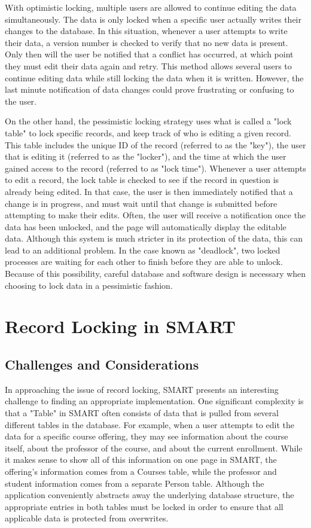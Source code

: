 \documentclass[12pt]{article}
\begin{document}
With optimistic locking, multiple users are allowed to continue editing the data simultaneously. The data is only locked when a specific user actually writes their changes to the database. In this situation, whenever a user attempts to write their data, a version number is checked to verify that no new data is present. Only then will the user be notified that a conflict has occurred, at which point they must edit their data again and retry. This method allows several users to continue editing data while still locking the data when it is written. However, the last minute notification of data changes could prove frustrating or confusing to the user.

On the other hand, the pessimistic locking strategy uses what is called a "lock table" to lock specific records, and keep track of who is editing a given record. This table includes the unique ID of the record (referred to as the "key"), the user that is editing it (referred to as the "locker"), and the time at which the user gained access to the record (referred to as "lock time"). Whenever a user attempts to edit a record, the lock table is checked to see if the record in question is already being edited. In that case, the user is then immediately notified that a change is in progress, and must wait until that change is submitted before attempting to make their edits. Often, the user will receive a notification once the data has been unlocked, and the page will automatically display the editable data. Although this system is much stricter in its protection of the data, this can lead to an additional problem. In the case known as "deadlock", two locked processes are waiting for each other to finish before they are able to unlock. Because of this possibility, careful database and software design is necessary when choosing to lock data in a pessimistic fashion.

\newpage
\section{Record Locking in SMART}

\subsection{Challenges and Considerations}

In approaching the issue of record locking, SMART presents an interesting challenge to finding an appropriate implementation. One significant complexity is that a "Table" in SMART often consists of data that is pulled from several different tables in the database. For example, when a user attempts to edit the data for a specific course offering, they may see information about the course itself, about the professor of the course, and about the current enrollment. While it makes sense to show all of this information on one page in SMART, the offering's information comes from a Courses table, while the professor and student information comes from a separate Person table. Although the application conveniently abstracts away the underlying database structure, the appropriate entries in both tables must be locked in order to ensure that all applicable data is protected from overwrites.
\end{document}
